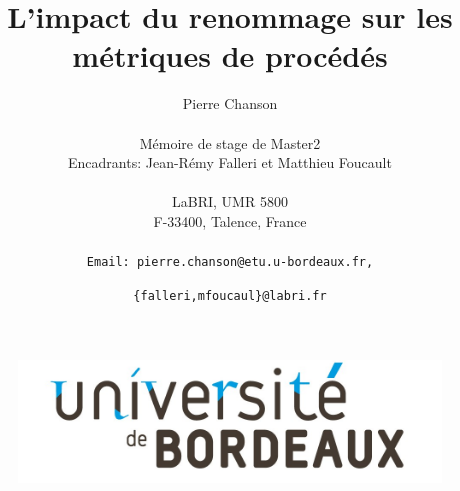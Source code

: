 \documentclass[12pt,a4paper]{article}
\title{\vspace{4cm}\textbf{L'impact du renommage sur les métriques de procédés}\vspace{3cm}}
\author{
Pierre Chanson\\\\
Mémoire de stage de Master2\\
Encadrants: Jean-Rémy Falleri et Matthieu Foucault\\\\
LaBRI, UMR 5800\\
F-33400, Talence, France\\\\
\texttt{Email: pierre.chanson@etu.u-bordeaux.fr,}\and
\texttt{\{falleri,mfoucaul\}@labri.fr}\\
}
\begin{document}
\begin{figure}[t]
\center
\includegraphics[scale=0.25]{data/figures/UnivBordeaux.jpg}
\end{figure}
\maketitle
\tableofcontents
\newpage






\newpage


%
\end{document}

